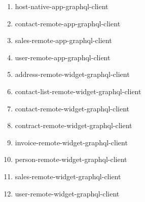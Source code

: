 \begin{enumerate}
  \item host-native-app-graphql-client
  \item contact-remote-app-graphql-client
  \item sales-remote-app-graphql-client
  \item user-remote-app-graphql-client
  \item address-remote-widget-graphql-client
  \item contact-list-remote-widget-graphql-client
  \item contact-remote-widget-graphql-client
  \item contract-remote-widget-graphql-client
  \item invoice-remote-widget-graphql-client
  \item person-remote-widget-graphql-client
  \item sales-remote-widget-graphql-client
  \item user-remote-widget-graphql-client
\end{enumerate}

